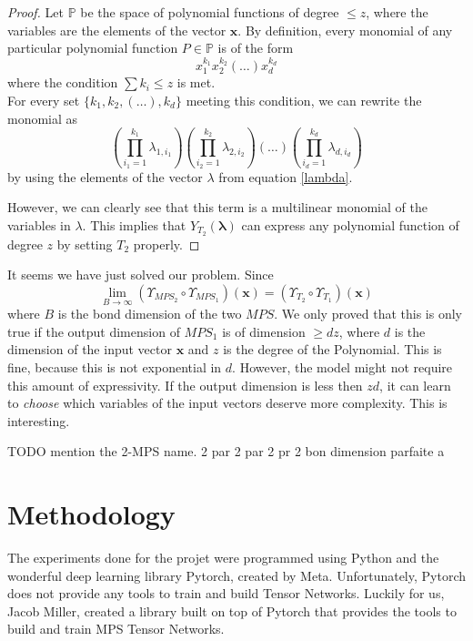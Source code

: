 \documentclass{article}
\theoremstyle{definition}
\theoremstyle{definition}
\begin{document}
\begin{proof}
Let $\mathbb{P}$ be the space of polynomial functions 
of degree $\leq z$, where the variables are the elements of the vector $\mathbf{x}$. By definition, every monomial of any particular polynomial function $P \in \mathbb{P}$ is of the form
\begin{equation}
    x_{1}^{k_1}x_{2}^{k_2}(\dots)x_{d}^{k_d}
\end{equation}
where the condition $\sum k_i \leq z$ is met. \\
For every set $\{k_1, k_2, (\dots), k_d\}$ meeting this condition,
we can rewrite the monomial as
\begin{equation}
    \left( \prod_{i_1=1}^{k_1}\lambda_{1, i_1} \right)
    \left( \prod_{i_2=1}^{k_2}\lambda_{2, i_2} \right)
    \left( \dots \right)
    \left( \prod_{i_d=1}^{k_d}\lambda_{d, i_d} \right)
\end{equation}
by using the elements of the vector $\lambda$ from equation \eqref{lambda}.

However, we can clearly see that this term is a multilinear 
monomial of the variables in $\lambda$. This implies that
$Y_{T_2}(\bm{\lambda})$ can express any polynomial function of degree $z$ by setting $T_2$ properly.





\end{proof}
It seems we have just solved our problem. Since
\[
    \lim_{B\to\infty}
    \left(\Upsilon_{MPS_2} \circ \Upsilon_{MPS_1}\right) (\mathbf{x})
    =
    \left(\Upsilon_{T_2} \circ \Upsilon_{T_1}\right) (\mathbf{x})
\]
where $B$ is the bond dimension of the two $MPS$.
We only proved that this is only true if the output dimension of $MPS_1$ is of dimension $\geq dz$, where $d$ is the dimension of the input vector $\mathbf{x}$ and $z$ is the degree of the Polynomial. This is fine, because this is not exponential in $d$. However, the model might not require this amount of expressivity. If the output dimension is less then $zd$, it can learn to \emph{choose} which variables of the input vectors deserve more complexity. This is interesting.


TODO mention the 2-MPS name.
2 par 2 par 2 pr 2
bon dimension parfaite a 


\section{Methodology}
The experiments done for the projet were programmed using Python and the wonderful deep learning library Pytorch, created by Meta.
Unfortunately, Pytorch does not provide any tools to train and build Tensor Networks. 
Luckily for us, Jacob Miller, created a library \cite{torchmps} built on top of Pytorch that provides the tools to build and train MPS Tensor Networks. 
\end{document}
